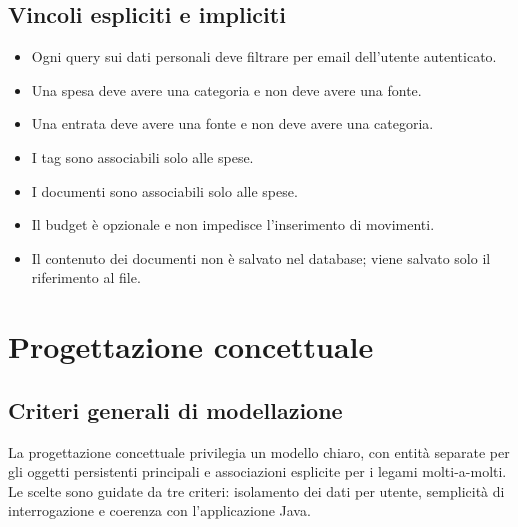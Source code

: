 \documentclass[11pt,a4paper]{article}
\begin{document}
\subsection{Vincoli espliciti e impliciti}
\begin{itemize}
    \item Ogni query sui dati personali deve filtrare per email dell'utente autenticato.
    \item Una spesa deve avere una categoria e non deve avere una fonte.
    \item Una entrata deve avere una fonte e non deve avere una categoria.
    \item I tag sono associabili solo alle spese.
    \item I documenti sono associabili solo alle spese.
    \item Il budget è opzionale e non impedisce l'inserimento di movimenti.
    \item Il contenuto dei documenti non è salvato nel database; viene salvato solo il riferimento al file.
\end{itemize}

\section{Progettazione concettuale}
\subsection{Criteri generali di modellazione}
La progettazione concettuale privilegia un modello chiaro, con entità separate per gli oggetti persistenti principali e associazioni esplicite per i legami molti-a-molti. Le scelte sono guidate da tre criteri: isolamento dei dati per utente, semplicità di interrogazione e coerenza con l'applicazione Java.
\end{document}
